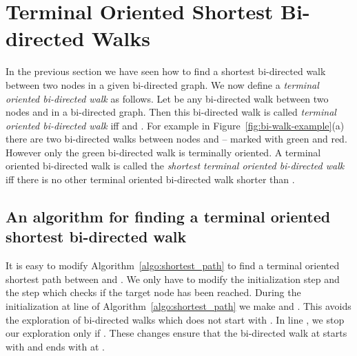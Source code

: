 \documentclass[runningheads]{llncs}
\begin{document}
\section{Terminal Oriented Shortest Bi-directed Walks}
In the previous section we have seen how to find a shortest bi-directed walk between two nodes in 
a given bi-directed graph. We now define a {\em terminal oriented bi-directed walk} as follows. 
Let  be any 
bi-directed walk between two nodes  and  in a bi-directed graph. Then this bi-directed
walk  is called {\em terminal oriented bi-directed walk} iff  and
. For example in Figure~\ref{fig:bi-walk-example}(a) there are two bi-directed
walks between nodes  and  -- marked with green and red. However only the green bi-directed walk is terminally oriented. A terminal oriented bi-directed walk
 is called the {\em shortest terminal oriented bi-directed walk} iff there is no other terminal
oriented bi-directed walk shorter than . 

\subsection{An algorithm for finding a terminal oriented shortest bi-directed walk}
It is easy to modify Algorithm~\ref{algo:shortest_path} to find a terminal oriented shortest path
between  and . We only have to modify the initialization step and the step which checks
if the target node has been reached. During the initialization at line  of Algorithm~\ref{algo:shortest_path}
we make  and . This avoids the exploration of bi-directed walks which does
not start with . In line , we stop our exploration only if . These changes
ensure that the bi-directed walk at  starts with  and ends with  at . 
\end{document}
